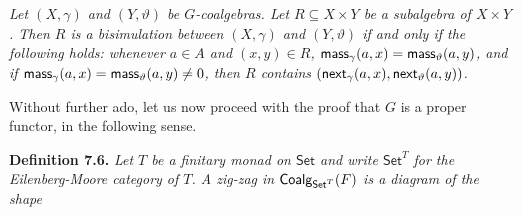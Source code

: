\hypertarget{html:S7.Thmtheorem5.p1}{} \emph{Let %
\hypertarget{html:S7.Thmtheorem5.p1.m1}{}\({(X,\gamma)}\) and %
\hypertarget{html:S7.Thmtheorem5.p1.m2}{}\({(Y,\vartheta)}\) be %
\hypertarget{html:S7.Thmtheorem5.p1.m3}{}\({G}\)-coalgebras. Let %
\hypertarget{html:S7.Thmtheorem5.p1.m4}{}\({R\subseteq X\times Y}\) be a subalgebra of %
\hypertarget{html:S7.Thmtheorem5.p1.m5}{}\({X\times Y}\). Then %
\hypertarget{html:S7.Thmtheorem5.p1.m6}{}\({R}\) is a bisimulation between %
\hypertarget{html:S7.Thmtheorem5.p1.m7}{}\({(X,\gamma)}\) and %
\hypertarget{html:S7.Thmtheorem5.p1.m8}{}\({(Y,\vartheta)}\) if and only if the following holds: whenever %
\hypertarget{html:S7.Thmtheorem5.p1.m9}{}\({a\in A}\) and %
\hypertarget{html:S7.Thmtheorem5.p1.m10}{}\({(x,y)\in R}\), %
\hypertarget{html:S7.Thmtheorem5.p1.m11}{}\({\mbox{\sf mass}_{\gamma}(a,x)=\mbox{\sf mass}_{\vartheta}(a,y)}\), and if %
\hypertarget{html:S7.Thmtheorem5.p1.m12}{}\({\mbox{\sf mass}_{\gamma}(a,x)=\mbox{\sf mass}_{\vartheta}(a,y)\neq 0}\), then %
\hypertarget{html:S7.Thmtheorem5.p1.m13}{}\({R}\) contains %
\hypertarget{html:S7.Thmtheorem5.p1.m14}{}\({(\mbox{\sf next}_{\gamma}(a,x),\mbox{\sf next}_{\vartheta}(a,y))}\).}
\par\medskip
\hypertarget{html:S7.SS0.SSS0.P0.SPx3.p4}{} Without further ado, let us now proceed with the proof that %
\hypertarget{html:S7.SS0.SSS0.P0.SPx3.p4.m1}{}\({G}\) is a proper functor, in the following sense.
\par\medskip
\hypertarget{html:S7.Thmtheorem6}{} \par\noindent\textbf{\textbf{Definition 7.6}\textbf{.}}\quad  %
\hypertarget{html:S7.Thmtheorem6.p1}{} \emph{Let %
\hypertarget{html:S7.Thmtheorem6.p1.m1}{}\({T}\) be a finitary monad on %
\hypertarget{html:S7.Thmtheorem6.p1.m2}{}\({\mathsf{Set}}\) and write %
\hypertarget{html:S7.Thmtheorem6.p1.m3}{}\({\mathsf{Set}^{T}}\) for the Eilenberg-Moore category of %
\hypertarget{html:S7.Thmtheorem6.p1.m4}{}\({T}\). A \emph{zig-zag} in %
\hypertarget{html:S7.Thmtheorem6.p1.m5}{}\({\mbox{\sf Coalg}_{\mathsf{Set}^{T}}(F)}\) is a diagram of the shape}

